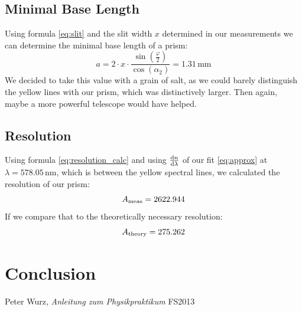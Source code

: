 \documentclass{scrreprt}
\newcommand{\unit}[1]{\ensuremath{\, \mathrm{#1}}}
\renewcommand{\phi}{\varphi}
\begin{document}
\subsection{Minimal Base Length}

Using formula \ref{eq:slit} and the slit width $x$ determined in our measurements we can determine the minimal base length of a prism:
\begin{equation}
	a = 2 \cdot x \cdot \frac{\sin(\frac{\phi}{2})}{\cos({\alpha_2})} = 1.31 \unit{mm}	
\end{equation}
We decided to take this value with a grain of salt, as we could barely distinguish the yellow lines with our prism, which was distinctively larger. Then again, maybe a more powerful telescope would have helped.

\subsection{Resolution}
Using formula \ref{eq:resolution_calc} and using $\frac{\dif{n}}{\dif{\lambda}}$ of our fit \ref{eq:approx} at $\lambda = 578.05 \unit{nm}$, which is between the yellow spectral lines, we calculated the resolution of our prism:
\begin{equation}
	A_{\text{meas}} = 2622.944
	\notag
\end{equation}
If we compare that to the theoretically necessary resolution:
\begin{equation}
	A_{\text{theory}} = 275.262
	\notag
\end{equation}




\section{Conclusion}

\begin{thebibliography}{9}

  Peter Wurz,
  \emph{Anleitung zum Physikpraktikum}
  FS2013

\end{thebibliography}
\end{document}
